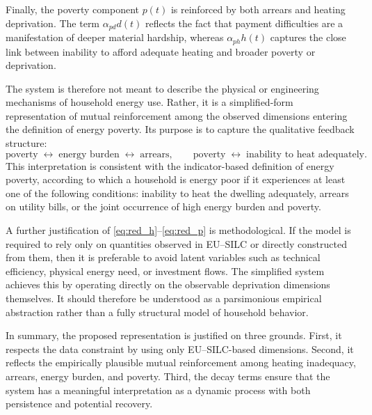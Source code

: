 \documentclass[11pt,a4paper]{article}
\begin{document}
Finally, the poverty component \(p(t)\) is reinforced by both arrears and heating deprivation. The term \(\alpha_{pd} d(t)\) reflects the fact that payment difficulties are a manifestation of deeper material hardship, whereas \(\alpha_{ph} h(t)\) captures the close link between inability to afford adequate heating and broader poverty or deprivation.

The system is therefore not meant to describe the physical or engineering mechanisms of household energy use. Rather, it is a simplified-form representation of mutual reinforcement among the observed dimensions entering the definition of energy poverty. Its purpose is to capture the qualitative feedback structure:
\[
\text{poverty} \;\longleftrightarrow\; \text{energy burden} \;\longleftrightarrow\; \text{arrears},
\qquad
\text{poverty} \;\longleftrightarrow\; \text{inability to heat adequately}.
\]
This interpretation is consistent with the indicator-based definition of energy poverty, according to which a household is energy poor if it experiences at least one of the following conditions: inability to heat the dwelling adequately, arrears on utility bills, or the joint occurrence of high energy burden and poverty.

A further justification of \eqref{eq:red_h}--\eqref{eq:red_p} is methodological. If the model is required to rely only on quantities observed in EU--SILC or directly constructed from them, then it is preferable to avoid latent variables such as technical efficiency, physical energy need, or investment flows. The simplified system achieves this by operating directly on the observable deprivation dimensions themselves. It should therefore be understood as a parsimonious empirical abstraction rather than a fully structural model of household behavior.

In summary, the proposed representation is justified on three grounds. First, it respects the data constraint by using only EU--SILC-based dimensions. Second, it reflects the empirically plausible mutual reinforcement among heating inadequacy, arrears, energy burden, and poverty. Third, the decay terms ensure that the system has a meaningful interpretation as a dynamic process with both persistence and potential recovery.
\end{document}
